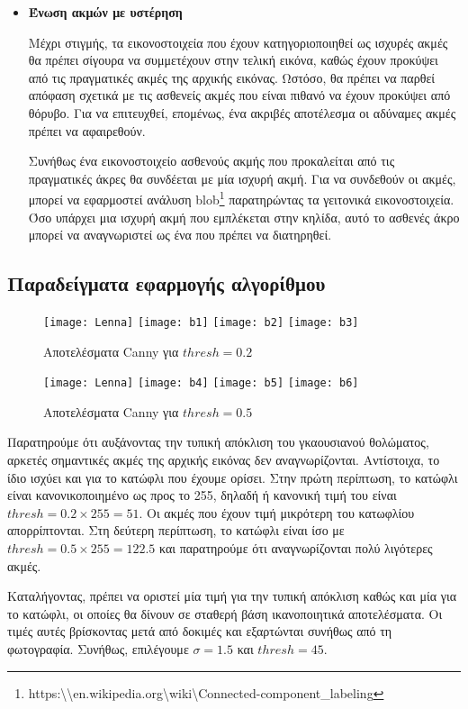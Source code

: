 \begin{itemize}[label={},leftmargin=*]
\item \textbf{Ένωση ακμών με υστέρηση}

Μέχρι στιγμής, τα εικονοστοιχεία που έχουν κατηγοριοποιηθεί ως ισχυρές ακμές θα πρέπει σίγουρα να συμμετέχουν στην τελική εικόνα, καθώς έχουν προκύψει από τις πραγματικές ακμές της αρχικής εικόνας. Ωστόσο, θα πρέπει να παρθεί απόφαση σχετικά με τις ασθενείς ακμές που είναι πιθανό να έχουν προκύψει από θόρυβο. Για να επιτευχθεί, επομένως, ένα ακριβές αποτέλεσμα οι αδύναμες ακμές πρέπει να αφαιρεθούν.

Συνήθως ένα εικονοστοιχείο ασθενούς ακμής που προκαλείται από τις πραγματικές άκρες θα συνδέεται με μία ισχυρή ακμή. Για να συνδεθούν οι ακμές, μπορεί να εφαρμοστεί ανάλυση blob\footnote{https:\textbackslash\textbackslash en.wikipedia.org\textbackslash wiki\textbackslash Connected-component\_labeling} παρατηρώντας τα γειτονικά εικονοστοιχεία. Όσο υπάρχει μια ισχυρή ακμή που εμπλέκεται στην κηλίδα, αυτό το ασθενές άκρο μπορεί να αναγνωριστεί ως ένα που πρέπει να διατηρηθεί.

\end{itemize}

\subsection{Παραδείγματα εφαρμογής αλγορίθμου}

\begin{figure}[H]
\centering
{}%
  {\texttt{[image: Lenna]}}
  {\texttt{[image: b1]}}
  {\texttt{[image: b2]}}
  {\texttt{[image: b3]}}
\caption{Αποτελέσματα Canny για $thresh=0.2$}
\end{figure}
\begin{figure}[H]
\centering
{}%
  {\texttt{[image: Lenna]}}
  {\texttt{[image: b4]}}
  {\texttt{[image: b5]}}
  {\texttt{[image: b6]}}
\caption{Αποτελέσματα Canny για $thresh=0.5$}
\end{figure}

Παρατηρούμε ότι αυξάνοντας την τυπική απόκλιση του γκαουσιανού θολώματος, αρκετές σημαντικές ακμές της αρχικής εικόνας δεν αναγνωρίζονται. Αντίστοιχα, το ίδιο ισχύει και για το κατώφλι που έχουμε ορίσει. Στην πρώτη περίπτωση, το κατώφλι είναι κανονικοποιημένο ως προς το 255, δηλαδή ή κανονική τιμή του είναι $thresh=0.2\times 255=51$. Οι ακμές που έχουν τιμή μικρότερη του κατωφλίου απορρίπτονται. Στη δεύτερη περίπτωση, το κατώφλι είναι ίσο με $thresh=0.5\times 255=122.5$ και παρατηρούμε ότι αναγνωρίζονται πολύ λιγότερες ακμές.

Καταλήγοντας, πρέπει να οριστεί μία τιμή για την τυπική απόκλιση καθώς και μία για το κατώφλι, οι οποίες θα δίνουν σε σταθερή βάση ικανοποιητικά αποτελέσματα. Οι τιμές αυτές βρίσκοντας μετά από δοκιμές και εξαρτώνται συνήθως από τη φωτογραφία. Συνήθως, επιλέγουμε $\sigma=1.5$ και $thresh=45$.
